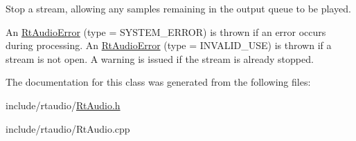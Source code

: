 Stop a stream, allowing any samples remaining in the output queue to be played. 

An \hyperlink{class_rt_audio_error}{Rt\+Audio\+Error} (type = S\+Y\+S\+T\+E\+M\+\_\+\+E\+R\+R\+OR) is thrown if an error occurs during processing. An \hyperlink{class_rt_audio_error}{Rt\+Audio\+Error} (type = I\+N\+V\+A\+L\+I\+D\+\_\+\+U\+SE) is thrown if a stream is not open. A warning is issued if the stream is already stopped. 

The documentation for this class was generated from the following files\+:\begin{DoxyCompactItemize}
\item 
include/rtaudio/\hyperlink{_rt_audio_8h}{Rt\+Audio.\+h}\item 
include/rtaudio/Rt\+Audio.\+cpp\end{DoxyCompactItemize}
